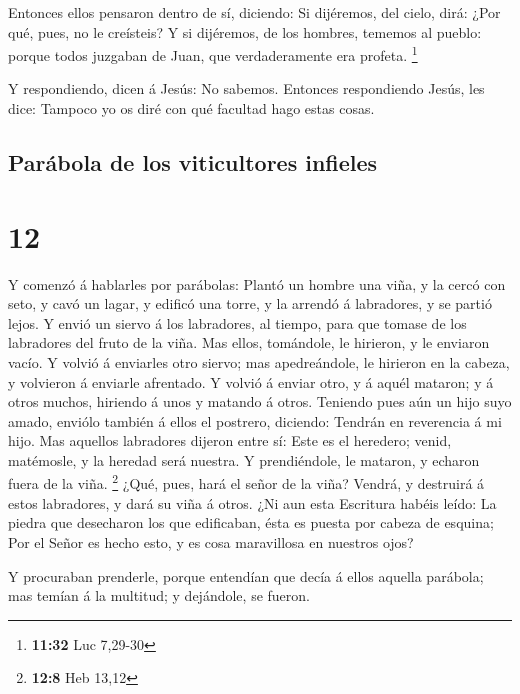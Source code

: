  Entonces ellos pensaron dentro de sí, diciendo: Si
dijéremos, del cielo, dirá: ¿Por qué, pues, no le creísteis?
 Y si dijéremos, de los hombres, tememos al pueblo: porque
todos juzgaban de Juan, que verdaderamente era profeta. \footnote{\textbf{11:32}
  Luc 7,29-30}

 Y respondiendo, dicen á Jesús: No sabemos. Entonces
respondiendo Jesús, les dice: Tampoco yo os diré con qué facultad hago
estas cosas.

\hypertarget{paruxe1bola-de-los-viticultores-infieles}{%
\subsection{Parábola de los viticultores
infieles}\label{paruxe1bola-de-los-viticultores-infieles}}

\hypertarget{section-11}{%
\section{12}\label{section-11}}

 Y comenzó á hablarles por parábolas: Plantó un hombre una
viña, y la cercó con seto, y cavó un lagar, y edificó una torre, y la
arrendó á labradores, y se partió lejos.  Y envió un siervo
á los labradores, al tiempo, para que tomase de los labradores del fruto
de la viña.  Mas ellos, tomándole, le hirieron, y le
enviaron vacío.  Y volvió á enviarles otro siervo; mas
apedreándole, le hirieron en la cabeza, y volvieron á enviarle
afrentado.  Y volvió á enviar otro, y á aquél mataron; y á
otros muchos, hiriendo á unos y matando á otros.  Teniendo
pues aún un hijo suyo amado, enviólo también á ellos el postrero,
diciendo: Tendrán en reverencia á mi hijo.  Mas aquellos
labradores dijeron entre sí: Este es el heredero; venid, matémosle, y la
heredad será nuestra.  Y prendiéndole, le mataron, y echaron
fuera de la viña. \footnote{\textbf{12:8} Heb 13,12}  ¿Qué,
pues, hará el señor de la viña? Vendrá, y destruirá á estos labradores,
y dará su viña á otros.  ¿Ni aun esta Escritura habéis
leído: La piedra que desecharon los que edificaban, ésta es puesta por
cabeza de esquina;  Por el Señor es hecho esto, y es cosa
maravillosa en nuestros ojos?

 Y procuraban prenderle, porque entendían que decía á ellos
aquella parábola; mas temían á la multitud; y dejándole, se fueron.

